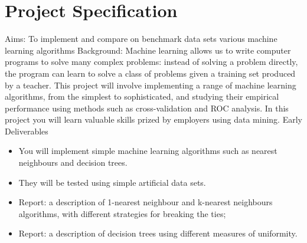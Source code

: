 \documentclass[]{final_report}
\begin{document}

\chapter*{Project Specification}

Aims: To implement and compare on benchmark data sets various machine learning algorithms
Background: Machine learning allows us to write computer programs to solve many complex problems: instead of solving a problem directly, the program can learn to solve a class of problems given a training set produced by a teacher. This project will involve implementing a range of machine learning algorithms, from the simplest to sophisticated, and studying their empirical performance using methods such as cross-validation and ROC analysis. In this project you will learn valuable skills prized by employers using data mining.
Early Deliverables

\begin{itemize}
  \item You will implement simple machine learning algorithms such as nearest neighbours and decision trees.
  \item They will be tested using simple artificial data sets.
  \item Report: a description of 1-nearest neighbour and k-nearest neighbours algorithms, with different strategies for breaking the ties;
  \item Report: a description of decision trees using different measures of uniformity.
\end{itemize}
\end{document}
